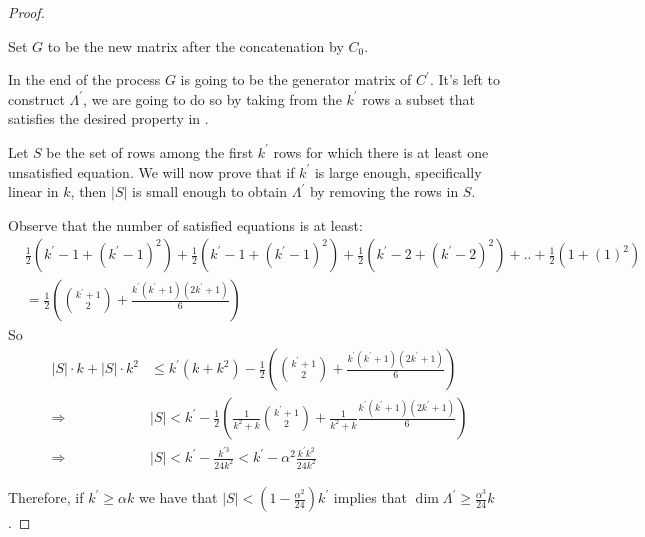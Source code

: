 \documentclass[manuscript,screen,review]{acmart}
\begin{document}
\begin{proof}
\begin{itemize}
      Set $G$ to be the new matrix after the concatenation by $C_{0}$.
  \end{itemize}

  In the end of the process $G$ is going to be the generator matrix of $C^{\prime}$. It's left to construct $\Lambda^{\prime}$, we are going to do so by taking from the $k^{\prime}$ rows a subset that satisfies the desired property in . 

Let $S$ be the set of rows among the first $k^{\prime}$ rows for which there is at least one unsatisfied equation. We will now prove that if $k^{\prime}$ is large enough, specifically linear in $k$, then $|S|$ is small enough to obtain $\Lambda^{\prime}$ by removing the rows in $S$.

Observe that the number of satisfied equations is at least:
  \begin{equation*}
    \begin{split}
      & \frac{1}{2}\left(k^{\prime}-1+(k^{\prime}-1)^{2}\right)  +\frac{1}{2}\left(k^{\prime}-1+(k^{\prime}-1)^{2}\right)  +\frac{1}{2}\left(k^{\prime}-2+(k^{\prime}-2)^{2}\right)  + .. +\frac{1}{2}\left(1+( 1 )^{2}\right) \\ 
      & = \frac{1}{2} \left(  { k^{\prime} + 1 \choose 2 }  + \frac{k^{\prime}(k^{\prime}+1)(2k^{\prime}+1)}{6} \right) 
    \end{split}
  \end{equation*}
  So 
  \begin{equation*}
    \begin{split}
      |S| \cdot k + |S|\cdot k^{2}  & \le  k^{\prime} \left( k + k^{2} \right) - \frac{1}{2} \left(  { k^{\prime} + 1 \choose 2 }  + \frac{k^{\prime}(k^{\prime}+1)(2k^{\prime}+1)}{6} \right) 
\\
\Rightarrow & |S| < k^{\prime} - \frac{1}{2}\left( \frac{1}{k^{2}+k} { k^{\prime} + 1 \choose 2 }  + \frac{1}{k^{2}+k} \frac{k^{\prime}(k^{\prime}+1)(2k^{\prime}+1)}{6} \right) \\
\Rightarrow & |S| < k^{\prime} - \frac{k^{\prime 3}}{24k^{2}} <k^{\prime} - \alpha^{2}\frac{k^{\prime} k^{2}}{24k^{2}} 
    \end{split}
  \end{equation*}

  Therefore, if $k^{\prime} \ge  \alpha k$ we have that $|S| < (1 -\frac{\alpha^{2}}{24})k^{\prime}$ implies that $\dim \Lambda^{\prime} \ge   \frac{\alpha^{3}}{24} k$.  

\end{proof}
\end{document}
